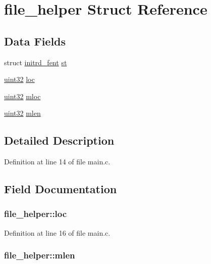 \hypertarget{structfile__helper}{
\section{file\_\-helper Struct Reference}
\label{structfile__helper}
}
\subsection*{Data Fields}
\begin{DoxyCompactItemize}
\item 
struct \hyperlink{structinitrd__fent}{initrd\_\-fent} \hyperlink{structfile__helper_a309aeca7d79673c8f4fd8aaecbfa113b}{st}
\item 
\hyperlink{int__types_8h_a1134b580f8da4de94ca6b1de4d37975e}{uint32} \hyperlink{structfile__helper_acb9dfdba5b63d8c7a2e1584d615274f9}{loc}
\item 
\hyperlink{int__types_8h_a1134b580f8da4de94ca6b1de4d37975e}{uint32} \hyperlink{structfile__helper_a25ca843744b9953f3ea3a5e5ac2a3aaf}{mloc}
\item 
\hyperlink{int__types_8h_a1134b580f8da4de94ca6b1de4d37975e}{uint32} \hyperlink{structfile__helper_a2ff78fbeaa21ac1ae33402629b04b93a}{mlen}
\end{DoxyCompactItemize}


\subsection{Detailed Description}


Definition at line 14 of file main.c.



\subsection{Field Documentation}
\hypertarget{structfile__helper_acb9dfdba5b63d8c7a2e1584d615274f9}{
\subsubsection[{loc}]{ {\bf file\_\-helper::loc}}}
\label{structfile__helper_acb9dfdba5b63d8c7a2e1584d615274f9}


Definition at line 16 of file main.c.

\hypertarget{structfile__helper_a2ff78fbeaa21ac1ae33402629b04b93a}{
\subsubsection[{mlen}]{ {\bf file\_\-helper::mlen}}}
\label{structfile__helper_a2ff78fbeaa21ac1ae33402629b04b93a}


